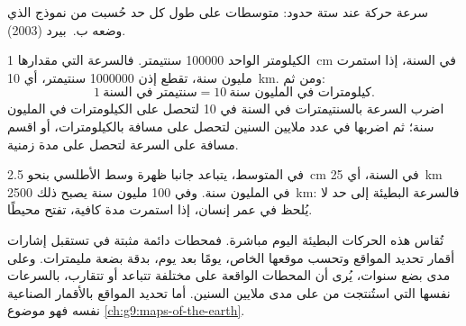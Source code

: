 \begin{omfigure}

{\small سرعة حركة  عند ستة حدود: متوسطات على طول كل حد
حُسبت من نموذج  الذي وضعه ب.~بيرد (2003).}
\end{omfigure}

\begin{method}\label{met:g7:plate-tectonics:convert}
الكيلومتر الواحد \num{100000} سنتيمتر. فالسرعة التي مقدارها \qty{1}{cm} في السنة،
إذا استمرت مليون سنة، تقطع إذن \num{1000000} سنتيمتر،
أي \qty{10}{km}. ومن ثم:
\[
  1\ \text{سنتيمتر في السنة} = 10\ \text{كيلومترات في المليون سنة}.
\]
اضرب السرعة بالسنتيمترات في السنة في 10 لتحصل على الكيلومترات في
المليون سنة؛ ثم اضربها في عدد ملايين السنين لتحصل على
مسافة بالكيلومترات، أو اقسم مسافة على السرعة لتحصل على مدة زمنية.
\end{method}

\begin{example}\label{ex:g7:plate-tectonics:atlantic}
في المتوسط، يتباعد جانبا ظهرة وسط الأطلسي بنحو
\qty{2.5}{cm} في السنة، أي \qty{25}{km} في المليون سنة. وفي 100
مليون سنة يصبح ذلك \qty{2500}{km}: فالسرعة البطيئة إلى حد لا يُلحظ في
عمر إنسان، إذا استمرت مدة كافية، تفتح محيطًا.
\end{example}

\begin{remark}\label{rem:g7:plate-tectonics:gps}
تُقاس هذه الحركات البطيئة اليوم مباشرة. فمحطات دائمة مثبتة في
 تستقبل إشارات أقمار تحديد المواقع وتحسب
موقعها الخاص، يومًا بعد يوم، بدقة بضعة مليمترات. وعلى مدى بضع سنوات،
يُرى أن المحطات الواقعة على  مختلفة تتباعد أو تتقارب،
بالسرعات نفسها التي استُنتجت من  على مدى ملايين السنين. أما
تحديد المواقع بالأقمار الصناعية نفسه فهو موضوع \cref{ch:g9:maps-of-the-earth}.
\end{remark}

